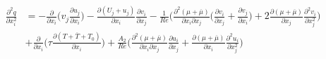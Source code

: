 \documentclass[preprint,12pt]{article}
\begin{document}
	\begin{align}\begin{split}
\frac{\partial^2 q}{\partial x_i^2}&=-\frac{\partial}{\partial x_i}\Bigg(v_j\frac{\partial u_j}{\partial x_i}\Bigg)-\frac{\partial(U_j+u_j)}{\partial x_i}\frac{\partial v_i}{\partial x_j}-\frac{1}{Re}\Bigg(\frac{\partial^2({\mu}+\overline{\mu})}{\partial x_i\partial x_j}\Big(\frac{\partial v_i}{\partial x_j}+\frac{\partial v_j}{\partial x_i}\Big)+2\frac{\partial ({\mu}+\overline{\mu})}{\partial x_j}\frac{\partial^2 v_i}{\partial x_j^2} \Bigg)\\&+\frac{\partial }{\partial x_i}\Bigg(\tau\frac{\partial (T+\overline{T}+T_0)}{\partial x_i}\Bigg)+\frac{A_2}{Re}\Bigg(\frac{\partial^2 (\mu+\overline{\mu})}{\partial x_i \partial x_j}\frac{\partial u_i}{\partial x_j}+\frac{\partial (\mu+\overline{\mu})}{\partial x_i}\frac{\partial^2u_i}{\partial x_j^2}\Bigg)
\end{split}
\end{align}	
\end{document}
